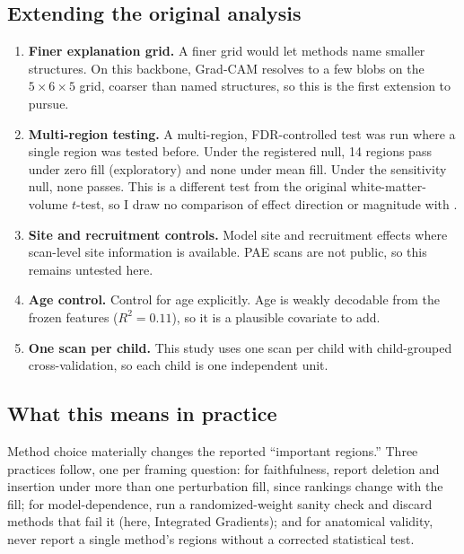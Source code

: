 \documentclass[11pt]{article}
\begin{document}
\subsection{Extending the original analysis}
\label{sec:open}
\begin{enumerate}[leftmargin=1.6em]
\item \textbf{Finer explanation grid.} A finer grid would let methods name smaller structures. On this backbone, Grad-CAM resolves to a few blobs on the $5\times6\times5$ grid, coarser than named structures, so this is the first extension to pursue.
\item \textbf{Multi-region testing.} A multi-region, FDR-controlled test was run where a single region was tested before. Under the registered null, 14 regions pass under zero fill (exploratory) and none under mean fill. Under the sensitivity null, none passes. This is a different test from the original white-matter-volume $t$-test, so I draw no comparison of effect direction or magnitude with \citet{das2024}.
\item \textbf{Site and recruitment controls.} Model site and recruitment effects where scan-level site information is available. PAE scans are not public, so this remains untested here.
\item \textbf{Age control.} Control for age explicitly. Age is weakly decodable from the frozen features ($R^2=0.11$), so it is a plausible covariate to add.
\item \textbf{One scan per child.} This study uses one scan per child with child-grouped cross-validation, so each child is one independent unit.
\end{enumerate}

\subsection{What this means in practice}
Method choice materially changes the reported ``important regions.'' Three practices follow,
one per framing question: for faithfulness, report deletion and insertion under more than one perturbation fill, since rankings change with the fill; for model-dependence, run a randomized-weight sanity check
and discard methods that fail it (here, Integrated Gradients); and for anatomical validity,
never report a single method's regions without a corrected statistical test.
\end{document}
